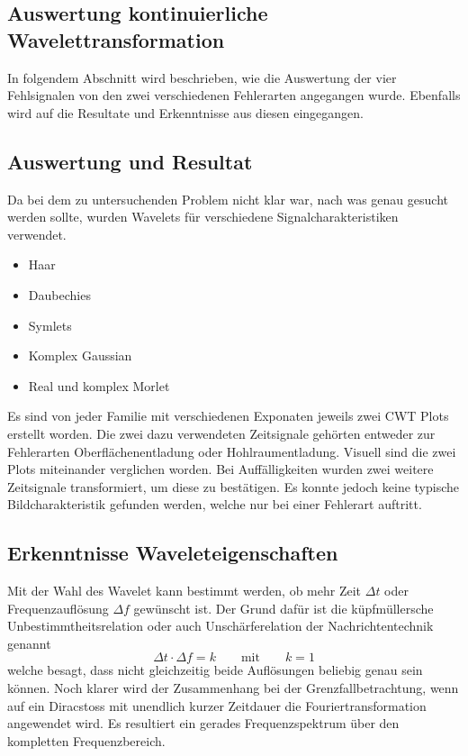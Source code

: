 \begin{refsection}
\section{Auswertung kontinuierliche Wavelettransformation}
In folgendem Abschnitt wird beschrieben, wie die Auswertung der vier Fehlsignalen von den zwei verschiedenen Fehlerarten angegangen wurde. 
Ebenfalls wird auf die Resultate und Erkenntnisse aus diesen eingegangen.
\subsection{Auswertung und Resultat}
Da bei dem zu untersuchenden Problem nicht klar war, nach was genau gesucht werden sollte, wurden Wavelets für verschiedene Signalcharakteristiken verwendet.
\begin{itemize}
	\item Haar
	\item Daubechies 
	\item Symlets
	\item Komplex Gaussian
	\item Real und komplex Morlet
\end{itemize}
Es sind von jeder Familie mit verschiedenen Exponaten jeweils zwei CWT Plots erstellt worden. 
Die zwei dazu verwendeten Zeitsignale gehörten entweder zur Fehlerarten Oberflächenentladung oder Hohlraumentladung.
Visuell sind die zwei Plots miteinander verglichen worden.
Bei Auffälligkeiten wurden zwei weitere Zeitsignale transformiert, um diese zu bestätigen.
Es konnte jedoch keine typische Bildcharakteristik gefunden werden, welche nur bei einer Fehlerart auftritt.

\subsection{Erkenntnisse Waveleteigenschaften}
Mit der Wahl des Wavelet kann bestimmt werden, ob mehr Zeit $\Delta t$ oder Frequenzauflösung $\Delta f$ gewünscht ist. 
Der Grund dafür ist die küpfmüllersche Unbestimmtheitsrelation oder auch Unschärferelation der Nachrichtentechnik genannt
\begin{equation}
\Delta t \cdot \Delta f = k
\qquad\text{mit}\qquad
k = 1
\end{equation}
welche besagt, dass nicht gleichzeitig beide Auflösungen beliebig genau sein können.
Noch klarer wird der Zusammenhang bei der Grenzfallbetrachtung, wenn auf ein Diracstoss mit unendlich kurzer Zeitdauer die Fouriertransformation angewendet wird.
Es resultiert ein gerades Frequenzspektrum über den kompletten Frequenzbereich.


\end{refsection}
